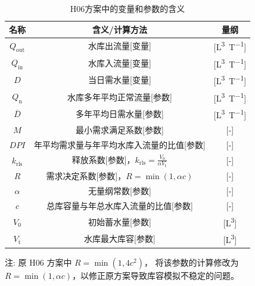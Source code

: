 \begin{table}[htbp]
  \centering
  \caption{H06方案中的变量和参数的含义}
  \label{tab:H06方案变量参数表}
  \begin{threeparttable}
    \begin{tabular}{ccc}
      \toprule
      名称               & 含义/计算方法                                                            & 量纲                \\ \midrule
      $Q_{\mathrm{out}}$ & 水库出流量[变量]                                                         & [\unit{L^3.T^{-1}}] \\
      $Q_{\mathrm{in}}$  & 水库入流量[变量]                                                         & [\unit{L^3.T^{-1}}] \\
      $D$                & 当日需水量[变量]                                                         & [\unit{L^3.T^{-1}}] \\
      $Q_{\mathrm {n}} $ & 水库多年平均正常流量[参数]                                               & [\unit{L^3.T^{-1}}] \\
      $\overline{D}$     & 多年平均日需水量[参数]                                                   & [\unit{L^3.T^{-1}}] \\
      $M$                & 最小需求满足系数[参数]                                                   & [-]                 \\
      $DPI$              & 年平均需求量与年平均水库入流量的比值[参数]                               & [-]                 \\
      $k_{\mathrm{rls}}$ & 释放系数[参数]，$k_{\mathrm{rls}} = \frac{V_0}{\alpha V_{\mathrm {t}} }$ & [-]                 \\
      $R$                & 需求决定系数[参数]，$R=\min(1, \alpha c)$                                & [-]                 \\
      $\alpha$           & 无量纲常数[参数]                                                         & [-]                 \\
      $c$                & 总库容量与年总水库入流量的比值[参数]                                     & [-]                 \\
      $V_0$              & 初始蓄水量[参数]                                                         & [\unit{L^3}]        \\
      $V_{\mathrm {t}} $ & 水库最大库容[参数]                                                       & [\unit{L^3}]        \\
      \bottomrule
    \end{tabular}
    \begin{tablenotes}
      \footnotesize
    \item[注:] 原 H06 方案中 $R=\min(1,4 c^2)$，\citet{Shin-etal_19} 将该参数的计算修改为 $R=\min(1,\alpha c)$，以修正原方案导致库容模拟不稳定的问题。
    \end{tablenotes}
  \end{threeparttable}
\end{table}

